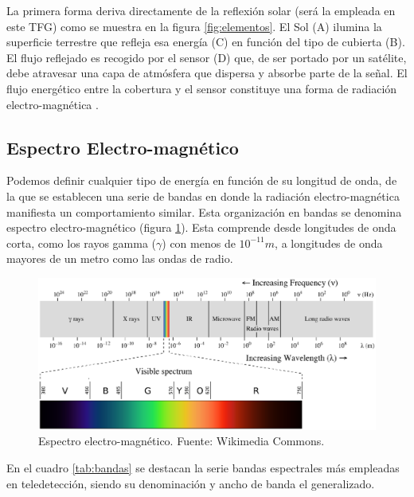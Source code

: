 La primera forma deriva directamente de la reflexión solar (será la empleada en este \ac{TFG}) como se muestra en la figura \ref{fig:elementos}. El Sol (A) ilumina la superficie terrestre que refleja esa energía (C) en función del tipo de cubierta (B). El flujo reflejado es recogido por el sensor (D) que, de ser portado por un satélite, debe atravesar una capa de atmósfera que dispersa y absorbe parte de la señal. El flujo energético entre la cobertura y el sensor constituye una forma de radiación electro-magnética \citep{Olaya2010}.\Sep

\subsection{Espectro Electro-magnético}
Podemos definir cualquier tipo de energía en función de su longitud de onda, de la que se establecen una serie de bandas en donde la radiación electro-magnética manifiesta un comportamiento similar. Esta organización en bandas se denomina espectro electro-magnético (figura \ref{fig:espectro}). Esta comprende desde longitudes de onda corta, como los rayos gamma ($\gamma$) con menos de $10^{-11} m$, a longitudes de onda mayores de un metro como las ondas de radio.\Sep

\begin{figure}[ht]
	\centering	
	\includegraphics[width=0.9\linewidth]{./Imagenes/Espectro.eps}
	\caption[Espectro electro-magnético]{Espectro electro-magnético. Fuente: Wikimedia Commons.}
	\label{fig:espectro}
\end{figure}

En el cuadro \ref{tab:bandas} se destacan la serie bandas espectrales más empleadas en teledetección, siendo su denominación y ancho de banda el generalizado.\Sep

